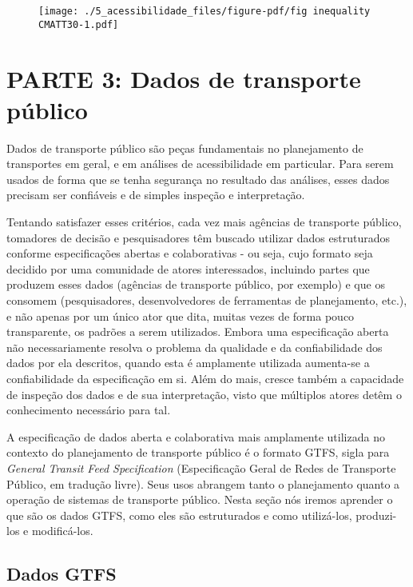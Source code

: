 \documentclass[
  letterpaper,
  DIV=11,
  numbers=noendperiod]{scrreprt}
\begin{document}
\begin{figure}[H]

{\centering \texttt{[image: ./5\_acessibilidade\_files/figure-pdf/fig inequality CMATT30-1.pdf]}

}

\end{figure}

\part{PARTE 3: Dados de transporte público}

Dados de transporte público são peças fundamentais no planejamento de
transportes em geral, e em análises de acessibilidade em particular.
Para serem usados de forma que se tenha segurança no resultado das
análises, esses dados precisam ser confiáveis e de simples inspeção e
interpretação.

Tentando satisfazer esses critérios, cada vez mais agências de
transporte público, tomadores de decisão e pesquisadores têm buscado
utilizar dados estruturados conforme especificações abertas e
colaborativas - ou seja, cujo formato seja decidido por uma comunidade
de atores interessados, incluindo partes que produzem esses dados
(agências de transporte público, por exemplo) e que os consomem
(pesquisadores, desenvolvedores de ferramentas de planejamento, etc.), e
não apenas por um único ator que dita, muitas vezes de forma pouco
transparente, os padrões a serem utilizados. Embora uma especificação
aberta não necessariamente resolva o problema da qualidade e da
confiabilidade dos dados por ela descritos, quando esta é amplamente
utilizada aumenta-se a confiabilidade da especificação em si. Além do
mais, cresce também a capacidade de inspeção dos dados e de sua
interpretação, visto que múltiplos atores detêm o conhecimento
necessário para tal.

A especificação de dados aberta e colaborativa mais amplamente utilizada
no contexto do planejamento de transporte público é o formato GTFS,
sigla para \emph{General Transit Feed Specification} (Especificação
Geral de Redes de Transporte Público, em tradução livre). Seus usos
abrangem tanto o planejamento quanto a operação de sistemas de
transporte público. Nesta seção nós iremos aprender o que são os dados
GTFS, como eles são estruturados e como utilizá-los, produzi-los e
modificá-los.

\hypertarget{dados-gtfs}{%
\chapter{Dados GTFS}\label{dados-gtfs}}
\end{document}
